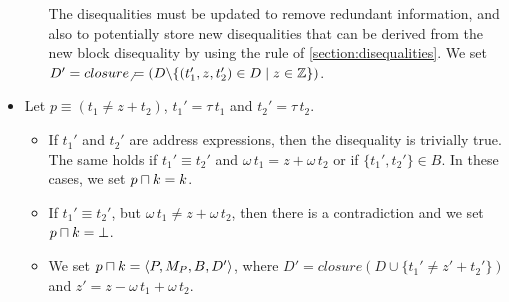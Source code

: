 \begin{itemize}
\begin{itemize}
          The disequalities must be updated to remove redundant information, and also to
          potentially store new disequalities that can be derived from the new block disequality by using the rule
           of \cref{section:disequalities}.
        We set $D' = closure_\neq(D \backslash \{(t_1',z,t_2') \in D \mid z \in \mathbb{Z}\})$.
    \end{itemize}
    \item Let $p \equiv (t_1 \neq z + t_2)$, $t_1'=\tau\,t_1$ and $t_2'=\tau\,t_2$.
    \begin{itemize}
        \item If $t_1'$ and $t_2'$ are address expressions, then the disequality is trivially true.
        The same holds if $t_1' \equiv t_2'$ and $\omega\,t_1 = z + \omega\,t_2$
        or if $\{t_1',t_2'\}\in B$. In these cases, we set $p \sqcap k = k$.
         \item If $t_1' \equiv t_2'$, but $\omega\,t_1 \neq z + \omega\,t_2$, then
         there is a contradiction and we set $p \sqcap k = \bot$.
         \item We set $p \sqcap k = \langle P,M_P,B,D'\rangle$, where $D' = closure(D \cup \{t_1' \neq z' + t_2'\})$
         and $z' = z - \omega\,t_1 + \omega\,t_2$.
    \end{itemize}
\end{itemize}

